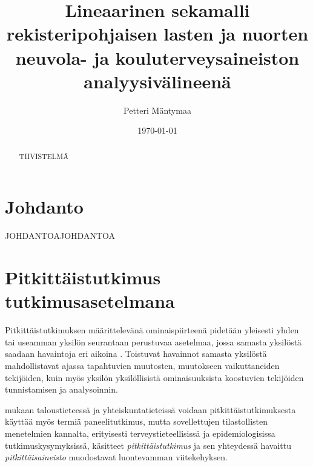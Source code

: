 \documentclass[finnish]{docopts}
\begin{document}
\singlespacing

\title{Lineaarinen sekamalli rekisteripohjaisen lasten ja nuorten neuvola- ja kouluterveysaineiston analyysivälineenä}
\author{Petteri Mäntymaa}
\date{\today}

\maketitle




\begin{abstract}

TIIVISTELMÄ

\end{abstract}

\mytableofcontents

\section{Johdanto}
\label{sec:johdanto}

JOHDANTOAJOHDANTOA

\section{Pitkittäistutkimus tutkimusasetelmana}
\label{sec:pitkittaistutkimus}

Pitkittäistutkimuksen määrittelevänä ominaispiirteenä pidetään yleisesti yhden tai useamman yksilön seurantaan perustuvaa asetelmaa, jossa samasta yksilöstä saadaan havaintoja eri aikoina \citep{diggle13, fitzmaurice11, twisk13, laird82}. Toistuvat havainnot samasta yksilöstä mahdollistavat ajassa tapahtuvien muutosten, muutokseen vaikuttaneiden tekijöiden, kuin myös yksilön yksilöllisistä ominaisuuksista koostuvien tekijöiden tunnistamisen ja analysoinnin.

\cite{diggle13} mukaan taloustieteessä ja yhteiskuntatieteissä voidaan pitkittäistutkimuksesta käyttää myös termiä paneelitutkimus, mutta sovellettujen tilastollisten menetelmien kannalta, erityisesti terveystieteellisissä ja epidemiologisissa tutkimuskysymyksissä, käsitteet \textit{pitkittäistutkimus} ja sen yhteydessä havaittu \textit{pitkittäisaineisto} muodostavat luontevamman viitekehyksen.
\end{document}
